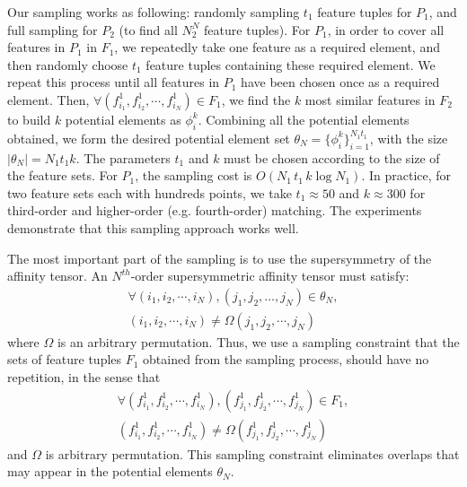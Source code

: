 Our sampling works as following: randomly sampling $t_1$ feature tuples for $P_1$, and full sampling for $P_2$ (to find all $N_2^N$ feature tuples).
For $P_1$, in order to cover all features in $P_1$ in $F_1$, we repeatedly take one feature as a required element,
and then  randomly choose $t_1$ feature tuples containing these required element.
We repeat this process until all features in $P_1$ have been chosen once as a required element.
Then, $\forall (f_{i_1}^1, f_{i_2}^1, \cdots, f_{i_N}^1)\in F_1$, we find the $k$ most similar features in $F_2$ to build $k$ potential elements as $\phi_i^k$.
Combining all the potential elements obtained, we form the desired potential element set $\theta_N = \{\phi_i^k\}_{i=1}^{N_1 t_1}$, with the size $|\theta_N| = N_1 t_1 k$.
The parameters $t_1$ and $k$ must be chosen according to the size of the feature sets. 
For $P_1$, the sampling cost is $O(N_1\, t_1\,  k\log N_1)$.
In practice, for two feature sets each with hundreds points, 
we take $t_1 \approx 50$ and $k \approx 300$ for third-order and higher-order (e.g. fourth-order) matching.
The experiments demonstrate that this sampling approach works well.


The most important part of the sampling is to use the supersymmetry of the affinity tensor.
An $N^{th}$-order supersymmetric affinity tensor must satisfy:
\begin{eqnarray}
\label{equ:noredun}
\forall (i_1,i_2,\cdots,i_N),(j_1,j_2,\ldots,j_N) \in \theta_N,\nonumber\\(i_1,i_2,\cdots,i_N)\neq\Omega(j_1,j_2,\cdots,j_N)
\end{eqnarray}
where $\Omega$ is an arbitrary permutation.
Thus, we use a sampling constraint that the sets of feature tuples $F_1$ obtained from the sampling process, should have no repetition, in the sense that
\begin{eqnarray}
\label{equ:noredun2}
\forall (f_{i_1}^1,f_{i_2}^1,\cdots,f_{i_N}^1),(f_{j_1}^1,f_{j_2}^1,\cdots,f_{j_N}^1) \in F_1,\nonumber\\ (f_{i_1}^1,f_{i_2}^1,\cdots,f_{i_N}^1)\neq\Omega(f_{j_1}^1,f_{j_2}^1,\cdots,f_{j_N}^1)
\end{eqnarray}
and $\Omega$ is arbitrary permutation.
This sampling constraint eliminates overlaps that may appear in the potential elements $\theta_N$.

